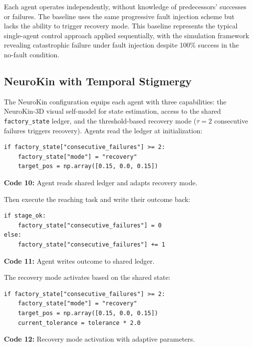 \documentclass[12pt,a4paper,oneside]{report}
\begin{document}
Each agent operates independently, without knowledge of predecessors' successes or failures. The baseline uses the same progressive fault injection scheme but lacks the ability to trigger recovery mode. This baseline represents the typical single-agent control approach applied sequentially, with the simulation framework revealing catastrophic failure under fault injection despite 100\% success in the no-fault condition.

\subsection{NeuroKin with Temporal Stigmergy}
\label{subsec:neurokin_with_temporal_stigmergy}

The NeuroKin configuration equips each agent with three capabilities: the NeuroKin-3D visual self-model for state estimation, access to the shared \texttt{factory\_state} ledger, and the threshold-based recovery mode ($\tau = 2$ consecutive failures triggers recovery). Agents read the ledger at initialization:

{\small
\begin{verbatim}
if factory_state["consecutive_failures"] >= 2:
    factory_state["mode"] = "recovery"
    target_pos = np.array([0.15, 0.0, 0.15])
\end{verbatim}
}
\vspace{0.2cm}
{\small \textbf{Code 10:} Agent reads shared ledger and adapts recovery mode.\label{code:ledger_read}}
\vspace{0.3cm}

Then execute the reaching task and write their outcome back:

{\small
\begin{verbatim}
if stage_ok:
    factory_state["consecutive_failures"] = 0
else:
    factory_state["consecutive_failures"] += 1
\end{verbatim}
}
\vspace{0.2cm}
{\small \textbf{Code 11:} Agent writes outcome to shared ledger.\label{code:ledger_write}}
\vspace{0.3cm}

The recovery mode activates based on the shared state:

{\small
\begin{verbatim}
if factory_state["consecutive_failures"] >= 2:
    factory_state["mode"] = "recovery"
    target_pos = np.array([0.15, 0.0, 0.15])
    current_tolerance = tolerance * 2.0
\end{verbatim}
}
\vspace{0.2cm}
{\small \textbf{Code 12:} Recovery mode activation with adaptive parameters.\label{code:recovery_activation}}
\vspace{0.3cm}
\end{document}
